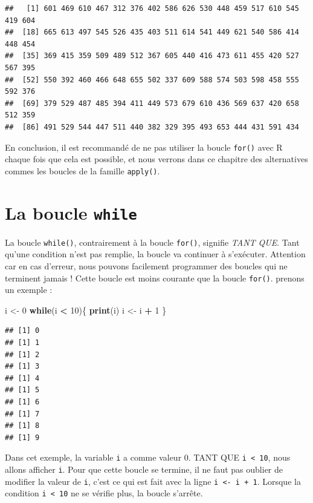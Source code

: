 \documentclass[]{book}
\newenvironment{Shaded}{\begin{snugshade}}{\end{snugshade}}
\newcommand{\ControlFlowTok}[1]{\textcolor[rgb]{0.13,0.29,0.53}{\textbf{#1}}}
\newcommand{\DecValTok}[1]{\textcolor[rgb]{0.00,0.00,0.81}{#1}}
\newcommand{\KeywordTok}[1]{\textcolor[rgb]{0.13,0.29,0.53}{\textbf{#1}}}
\newcommand{\NormalTok}[1]{#1}
\newcommand{\OperatorTok}[1]{\textcolor[rgb]{0.81,0.36,0.00}{\textbf{#1}}}
\newcommand{\StringTok}[1]{\textcolor[rgb]{0.31,0.60,0.02}{#1}}
\begin{document}
\begin{verbatim}
##   [1] 601 469 610 467 312 376 402 586 626 530 448 459 517 610 545 419 604
##  [18] 665 613 497 545 526 435 403 511 614 541 449 621 540 586 414 448 454
##  [35] 369 415 359 509 489 512 367 605 440 416 473 611 455 420 527 567 395
##  [52] 550 392 460 466 648 655 502 337 609 588 574 503 598 458 555 592 376
##  [69] 379 529 487 485 394 411 449 573 679 610 436 569 637 420 658 512 359
##  [86] 491 529 544 447 511 440 382 329 395 493 653 444 431 591 434
\end{verbatim}

En conclusion, il est recommandé de ne pas utiliser la boucle \texttt{for()} avec R chaque fois que cela est possible, et nous verrons dans ce chapitre des alternatives commes les boucles de la famille \texttt{apply()}.

\hypertarget{l17while}{%
\section{\texorpdfstring{La boucle \texttt{while}}{La boucle while}}\label{l17while}}

La boucle \texttt{while()}, contrairement à la boucle \texttt{for()}, signifie \emph{TANT QUE}. Tant qu'une condition n'est pas remplie, la boucle va continuer à s'exécuter. Attention car en cas d'erreur, nous pouvons facilement programmer des boucles qui ne terminent jamais ! Cette boucle est moins courante que la boucle \texttt{for()}. prenons un exemple :

\begin{Shaded}
\begin{Highlighting}[]
\NormalTok{i <-}\StringTok{ }\DecValTok{0}
\ControlFlowTok{while}\NormalTok{(i }\OperatorTok{<}\StringTok{ }\DecValTok{10}\NormalTok{)\{}
  \KeywordTok{print}\NormalTok{(i)}
\NormalTok{  i <-}\StringTok{ }\NormalTok{i }\OperatorTok{+}\StringTok{ }\DecValTok{1}
\NormalTok{\}}
\end{Highlighting}
\end{Shaded}

\begin{verbatim}
## [1] 0
## [1] 1
## [1] 2
## [1] 3
## [1] 4
## [1] 5
## [1] 6
## [1] 7
## [1] 8
## [1] 9
\end{verbatim}

Dans cet exemple, la variable \texttt{i} a comme valeur 0. TANT QUE \texttt{i\ \textless{}\ 10}, nous allons afficher \texttt{i}. Pour que cette boucle se termine, il ne faut pas oublier de modifier la valeur de \texttt{i}, c'est ce qui est fait avec la ligne \texttt{i\ \textless{}-\ i\ +\ 1}. Lorsque la condition \texttt{i\ \textless{}\ 10} ne se vérifie plus, la boucle s'arrête.
\end{document}
